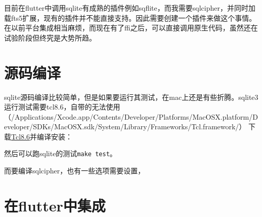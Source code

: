 \documentclass[12pt]{article}
\begin{document}
\makeblogtitle

目前在flutter中调用sqlite有成熟的插件例如sqflite，而我需要sqlcipher，并同时加载fts5扩展，现有的插件并不能直接支持。因此需要创建一个插件来做这个事情。在以前平台集成相当麻烦，而现在有了ffi之后，可以直接调用原生代码，虽然还在试验阶段但终究是大势所趋。

\section{源码编译}\label{ux6e90ux7801ux7f16ux8bd1}

sqlite源码编译比较简单，但是如果要运行其测试，在mac上还是有些折腾。sqlite3运行测试需要tcl8.6，自带的无法使用（/Applications/Xcode.app/Contents/Developer/Platforms/MacOSX.platform/Developer/SDKs/MacOSX.sdk/System/Library/Frameworks/Tcl.framework/） 下载\href{https://www.tcl.tk/software/tcltk/download.html}{Tcl8.6}并编译安装：

\begin{Shaded}
\begin{Highlighting}[]
\end{Highlighting}
\end{Shaded}

然后可以跑sqlite的测试\texttt{make\ test}。

而要编译sqlcipher，也有一些选项需要设置，

\begin{Shaded}
\begin{Highlighting}[]
 \OperatorTok{=}\DataTypeTok{\textbackslash{}}
  \OperatorTok{=}\DataTypeTok{\textbackslash{}}
   \DataTypeTok{\textbackslash{}}
 \DataTypeTok{\textbackslash{}}
\end{Highlighting}
\end{Shaded}

\section{在flutter中集成}\label{ux5728flutterux4e2dux96c6ux6210}
\end{document}
